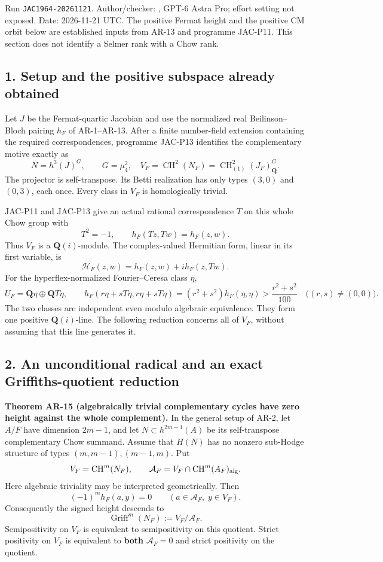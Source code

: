 \documentclass[11pt,a4paper]{article}
\providecommand{\mathscr}[1]{\mathcal{#1}}
\begin{document}
Run \texttt{JAC1964-20261121}. Author/checker:
, GPT-6 Astra Pro; effort setting not
exposed. Date: 2026-11-21 UTC. The positive Fermat height and the
positive CM orbit below are established inputs from AR-13 and programme
JAC-P11. This section does not identify a Selmer rank with a Chow rank.

\subsection{1. Setup and the positive subspace already
obtained}\label{setup-and-the-positive-subspace-already-obtained}

Let \(J\) be the Fermat-quartic Jacobian and use the normalized real
Beilinson--Bloch pairing \(h_F\) of AR-1--AR-13. After a finite
number-field extension containing the required correspondences,
programme JAC-P13 identifies the complementary motive exactly as \[
N=h^3(J)^G,\qquad G=\mu_4^2,
\quad V_F=\operatorname{CH}^2(N_F)
       =\operatorname{CH}^2_{(1)}(J_F)_{\mathbf Q}^{G}.
\tag{AR15.1}
\] The projector is self-transpose. Its Betti realization has only types
\((3,0)\) and \((0,3)\), each once. Every class in \(V_F\) is
homologically trivial.

JAC-P11 and JAC-P13 give an actual rational correspondence \(T\) on this
whole Chow group with \[
T^2=-1,
\qquad h_F(Tz,Tw)=h_F(z,w).
\] Thus \(V_F\) is a \(\mathbf Q(i)\)-module. The complex-valued
Hermitian form, linear in its first variable, is \[
\mathscr H_F(z,w)=h_F(z,w)+i h_F(z,Tw).
\] For the hyperflex-normalized Fourier--Ceresa class \(\eta\), \[
U_F=\mathbf Q\eta\oplus\mathbf Q T\eta,
\qquad h_F(r\eta+sT\eta,r\eta+sT\eta)
  =(r^2+s^2)h_F(\eta,\eta)>
  \frac{r^2+s^2}{100}\quad\bigl((r,s)\ne(0,0)\bigr).
\tag{AR15.2}
\] The two classes are independent even modulo algebraic equivalence.
They form one positive \(\mathbf Q(i)\)-line. The following reduction
concerns all of \(V_F\), without assuming that this line generates it.

\subsection{2. An unconditional radical and an exact Griffiths-quotient
reduction}\label{an-unconditional-radical-and-an-exact-griffiths-quotient-reduction}

\textbf{Theorem AR-15 (algebraically trivial complementary cycles have
zero height against the whole complement).} In the general setup of
AR-2, let \(A/F\) have dimension \(2m-1\), and let
\(N\subset h^{2m-1}(A)\) be its self-transpose complementary Chow
summand. Assume that \(H(N)\) has no nonzero sub-Hodge structure of
types \((m,m-1),(m-1,m)\). Put \[
V_F=\operatorname{CH}^m(N_F),\qquad
\mathcal A_F=V_F\cap\operatorname{CH}^m(A_F)_{\rm alg}.
\] Here algebraic triviality may be interpreted geometrically. Then \[
(-1)^m h_F(a,y)=0
\qquad(a\in\mathcal A_F,\;y\in V_F).
\tag{AR15.3}
\] Consequently the signed height descends to \[
\operatorname{Griff}^m(N_F):=V_F/\mathcal A_F.
\tag{AR15.4}
\] Semipositivity on \(V_F\) is equivalent to semipositivity on this
quotient. Strict positivity on \(V_F\) is equivalent to \textbf{both}
\(\mathcal A_F=0\) and strict positivity on the quotient.
\end{document}
